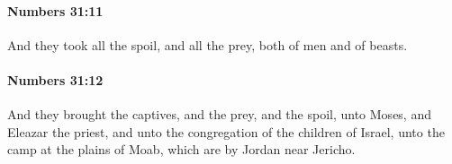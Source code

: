 		\paragraph{Numbers 31:11} %
			\label{NUMBERS-31-11}

			And they took all the spoil, and all the prey, both of men and of beasts.


		\paragraph{Numbers 31:12} %
			\label{NUMBERS-31-12}

			And they brought the captives, and the prey, and the spoil, unto Moses, and Eleazar the priest, and unto the congregation of the children of Israel, unto the camp at the plains of Moab, which are by Jordan near Jericho.


